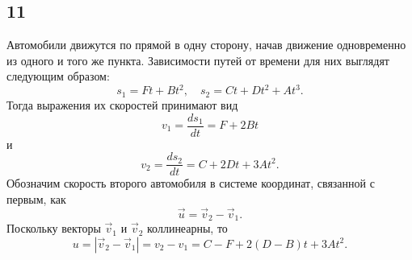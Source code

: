 \subsection{11}

Автомобили движутся по прямой в одну сторону, начав движение одновременно из одного и того же пункта. Зависимости путей от времени для них выглядят следующим образом:
\[
s_1=Ft+Bt^2,\quad s_2=Ct+Dt^2+At^3.
\]
Тогда выражения их скоростей принимают вид
\[
v_1=\frac{ds_1}{dt}=F+2Bt
\]
и
\[
v_2=\frac{ds_2}{dt}=C+2Dt+3At^2.
\]
Обозначим скорость второго автомобиля в системе координат, связанной с первым, как
\[
\vec u=\vec v_2-\vec v_1.
\]
Поскольку векторы $\vec v_1$ и $\vec v_2$ коллинеарны, то
\[
u=\left|\vec v_2-\vec v_1\right|=v_2-v_1=C-F+2(D-B)t+3At^2.
\]